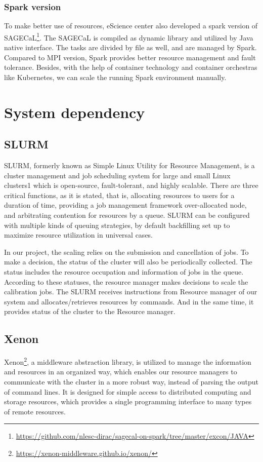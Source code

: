 \subsubsection*{Spark version}
To make better use of resources, eScience center also developed a spark version of SAGECaL\footnote{\url{https://github.com/nlesc-dirac/sagecal-on-spark/tree/master/excon/JAVA}}.
The SAGECaL is compiled as dynamic library and utilized by Java native interface. The tasks are divided by file as well, and are managed by Spark. 
Compared to MPI version, Spark provides better resource management and fault tolerance. 
Besides, with the help of container technology and container orchestras like Kubernetes, we can scale the running Spark environment manually.
\section{System dependency}
\subsection{SLURM}
SLURM, formerly known as Simple Linux Utility for Resource Management, is a cluster management and job scheduling system for large and small Linux clusters1 which is
open-source, fault-tolerant, and highly scalable. There are three critical functions, as it
is stated, that is, allocating resources to users for a duration of time, providing a job
management framework over-allocated node, and arbitrating contention for resources by
a queue. SLURM can be configured with multiple kinds of queuing strategies, by default
backfilling set up to maximize resource utilization in universal cases.

In our project, the scaling relies on the submission and cancellation of jobs. To
make a decision, the status of the cluster will also be periodically collected. The status
includes the resource occupation and information of jobs in the queue. According to
these statuses, the resource manager makes decisions to scale the calibration jobs. The
SLURM receives instructions from Resource manager of our system and allocates/retrieves
resources by commands. And in the same time, it provides status of the cluster to the
Resource manager.

\subsection{Xenon}
Xenon\footnote{\url{https://xenon-middleware.github.io/xenon/}}, a middleware abstraction library, is utilized to manage the information and resources in an organized way, which enables our resource managers to communicate with the cluster in a more robust way, instead of parsing the output of command lines. 
It is designed for simple access to distributed computing and storage resources, which provides a single programming interface to many types of remote resources. 
